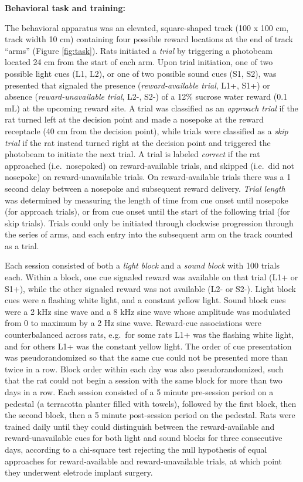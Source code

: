 \documentclass[11pt]{article}
\begin{document}
{\bf Behavioral task and training:}

The behavioral apparatus was an elevated, square-shaped track (100 x
100 cm, track width 10 cm) containing four possible reward locations
at the end of track ``arms'' (Figure \ref{fig:task}). Rats initiated a
{\it trial} by triggering a photobeam located 24 cm from the start of
each arm. Upon trial initiation, one of two possible light cues (L1,
L2), or one of two possible sound cues (S1, S2), was presented that
signaled the presence ({\it reward-available trial}, L1+, S1+) or
absence ({\it reward-unavailable trial}, L2-, S2-) of a 12\% sucrose
water reward (0.1 mL) at the upcoming reward site. A trial was
classified as an {\it approach trial} if the rat turned left at the
decision point and made a nosepoke at the reward receptacle (40 cm
from the decision point), while trials were classified as a {\it skip
  trial} if the rat instead turned right at the decision point and
triggered the photobeam to initiate the next trial. A trial is labeled
{\it correct} if the rat approached (i.e.\ nosepoked) on
reward-available trials, and skipped (i.e.\ did not nosepoke) on
reward-unavailable trials. On reward-available trials there was a 1
second delay between a nosepoke and subsequent reward delivery. {\it
  Trial length} was determined by measuring the length of time from
cue onset until nosepoke (for approach trials), or from cue onset
until the start of the following trial (for skip trials). Trials could
only be initiated through clockwise progression through the series of
arms, and each entry into the subsequent arm on the track counted as a
trial.

Each session consisted of both a {\it light block} and a {\it sound block} with
100 trials each. Within a block, one cue signaled reward was available on that
trial (L1+ or S1+), while the other signaled reward was not available (L2- or
S2-). Light block cues were a flashing white light, and a constant yellow
light. Sound block cues were a 2 kHz sine wave and a 8 kHz sine wave whose
amplitude was modulated from 0 to maximum by a 2 Hz sine wave. Reward-cue
associations were counterbalanced across rats, e.g.\ for some rats L1+ was the
flashing white light, and for others L1+ was the constant yellow light. The
order of cue presentation was pseudorandomized so that the same cue could not be
presented more than twice in a row. Block order within each day was also
pseudorandomized, such that the rat could not begin a session with the same
block for more than two days in a row. Each session consisted of a 5 minute
pre-session period on a pedestal (a terracotta planter filled with towels),
followed by the first block, then the second block, then a 5 minute post-session
period on the pedestal. Rats were trained daily until they could distinguish
between the reward-available and reward-unavailable cues for both light and
sound blocks for three consecutive days, according to a chi-square test
rejecting the null hypothesis of equal approaches for reward-available and
reward-unavailable trials, at which point they underwent eletrode implant
surgery.
\end{document}
